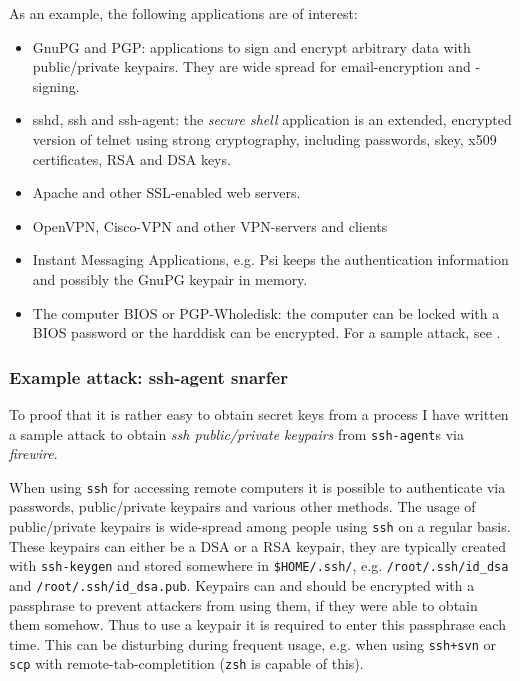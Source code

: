 As an example, the following applications are of interest:

\begin{itemize}

	\item GnuPG and PGP: applications to sign and encrypt arbitrary data
	with public/private keypairs. They are wide spread for email-encryption
	and -signing.

	\item sshd, ssh and ssh-agent: the \emph{secure shell} application is an
	extended, encrypted version of telnet using strong cryptography,
	including passwords, skey, x509 certificates, RSA and DSA keys.

	\item Apache and other SSL-enabled web servers.

	\item OpenVPN, Cisco-VPN and other VPN-servers and clients

	\item Instant Messaging Applications, e.g. Psi keeps the authentication
	information and possibly the GnuPG keypair in memory.

	\item The computer BIOS or PGP-Wholedisk: the computer can be locked
	with a BIOS password or the harddisk can be encrypted. For a sample
	attack, see \cite{rux2k6firewire:2006}.

\end{itemize}


\subsubsection{Example attack: ssh-agent snarfer}

\label{ssh-agent-snarfer} To proof that it is rather easy to obtain secret keys
from a process I have written a sample attack to obtain \emph{ssh public/private
keypairs} from \texttt{ssh-agent}s via \emph{firewire}.

When using \texttt{ssh} for accessing remote computers it is possible to
authenticate via passwords, public/private keypairs and various other methods.
The usage of public/private keypairs is wide-spread among people using
\texttt{ssh} on a regular basis. These keypairs can either be a DSA or a RSA
keypair, they are typically created with \texttt{ssh-keygen} and stored
somewhere in \texttt{\$HOME/.ssh/}, e.g.  \texttt{/root/.ssh/id\_dsa} and
\texttt{/root/.ssh/id\_dsa.pub}. Keypairs can and should be encrypted with a
passphrase to prevent attackers from using them, if they were able to obtain
them somehow. Thus to use a keypair it is required to enter this passphrase each
time. This can be disturbing during frequent usage, e.g. when using
\texttt{ssh+svn} or \texttt{scp} with remote-tab-completition (\texttt{zsh} is
capable of this).

